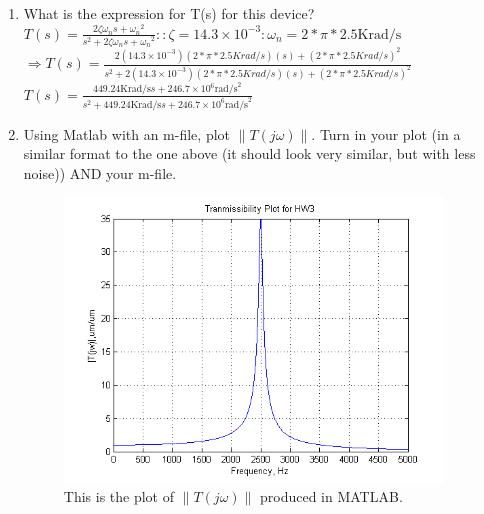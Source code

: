 \documentclass{article}
\begin{document}
\begin{enumerate}
	\item What is the expression for T(s) for this device?\\
		$ T(s) = \frac{2\zeta\omega_n s + {\omega_n}^2}{s^2 + 2\zeta\omega_n s + {\omega_n}^2}
		\colon\colon \zeta = 14.3 \times 10^{-3} \colon \omega_n = 2*\pi*2.5\text{Krad/s}$\\
		$\Rightarrow T(s) = \frac{2 (14.3\times 10^{-3})(2*\pi*2.5Krad/s)(s) + (2*\pi*2.5Krad/s)^2}{
			s^2 + 2 (14.3\times 10^{-3})(2*\pi*2.5Krad/s)(s) + (2*\pi*2.5Krad/s)^2}$\\
		$ T(s) = \frac{449.24 \text{Krad/s} s + 246.7\times 10^6 {\text{rad/s}}^2}{
			s^2 + 449.24 \text{Krad/s} s + 246.7\times 10^6 {\text{rad/s}}^2}$
	\item Using Matlab with an m-file, plot $\|T(j\omega)\|$. 
		Turn in your plot (in a similar format to
   		the one above (it should look very similar, but with less noise)) AND your m-file.\\

\begin{figure}[h]
   \centering
   \includegraphics[width=0.95\textwidth,keepaspectratio]{HW3_plot}
   \caption{ This is the plot of $\|T(j\omega)\|$ produced in MATLAB. }
   \label{fig:HW3_plot}
\end{figure}



\end{enumerate}



\label{end}
\end{document}
